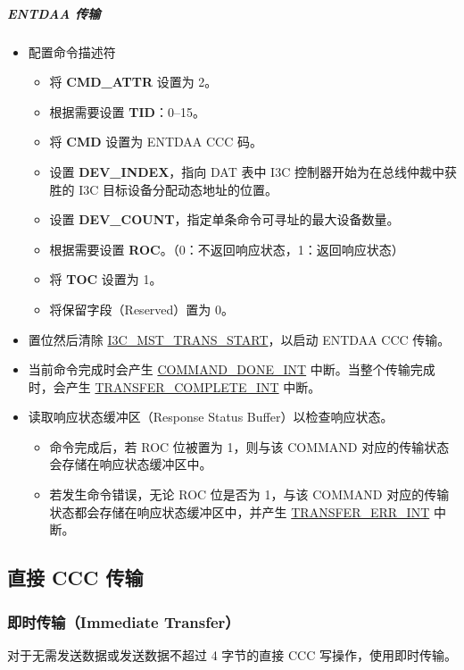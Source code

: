 \documentclass[main\_\_CN.tex]{subfiles}
\begin{document}
\subparagraph{ENTDAA 传输}
\begin{itemize}
    \item 配置命令描述符
    \begin{itemize}
        \item 将 \textbf{CMD\_ATTR} 设置为 2。
        \item 根据需要设置 \textbf{TID}：0–15。
        \item 将 \textbf{CMD} 设置为 ENTDAA CCC 码。
        \item 设置 \textbf{DEV\_INDEX}，指向 DAT 表中 I3C 控制器开始为在总线仲裁中获胜的 I3C 目标设备分配动态地址的位置。
        \item 设置 \textbf{DEV\_COUNT}，指定单条命令可寻址的最大设备数量。
        \item 根据需要设置 \textbf{ROC}。（0：不返回响应状态，1：返回响应状态）
        \item 将 \textbf{TOC} 设置为 1。
        \item 将保留字段（Reserved）置为 0。
    \end{itemize}
    \item 置位然后清除 \hyperref[fielddesc:I3CMSTREGTRANSSTART]{I3C\_MST\_TRANS\_START}，以启动 ENTDAA CCC 传输。
    \item 当前命令完成时会产生 \hyperref[int:COMMANDDONEINT]{COMMAND\_DONE\_INT} 中断。当整个传输完成时，会产生 \hyperref[int:TRANSFERCOMPLETEINT]{TRANSFER\_COMPLETE\_INT} 中断。
    \item 读取响应状态缓冲区（Response Status Buffer）以检查响应状态。
    \begin{itemize}
        \item 命令完成后，若 ROC 位被置为 1，则与该 COMMAND 对应的传输状态会存储在响应状态缓冲区中。
        \item 若发生命令错误，无论 ROC 位是否为 1，与该 COMMAND 对应的传输状态都会存储在响应状态缓冲区中，并产生 \hyperref[int:TRANSFERERRINT]{TRANSFER\_ERR\_INT} 中断。
    \end{itemize}
\end{itemize}


\subsection{直接 CCC 传输}

\subsubsection{即时传输（Immediate Transfer）}
对于无需发送数据或发送数据不超过 4 字节的直接 CCC 写操作，使用即时传输。
\end{document}
